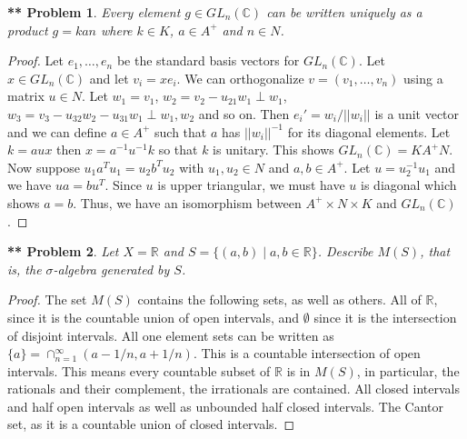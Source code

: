\documentclass{article}
\newtheorem{**}{** Problem}
\begin{document}
\begin{flushleft}
\begin{**}
Every element $g \in GL_n(\mathbb{C})$ can be written uniquely as a product $g = kan$ where $k \in K$, $a \in A^+$ and $n \in N$.
\end{**}
\begin{proof}
Let $e_1, \dots , e_n$ be the standard basis vectors for $GL_n (\mathbb{C})$. Let $x \in GL_n (\mathbb{C})$ and let $v_i = xe_i$. We can orthogonalize $v = (v_1, \dots , v_n)$ using a matrix $u \in N$. Let $w_1 = v_1$, $w_2 = v_2 - u_{21} w_1 \perp w_1$, $w_3 = v_3 - u_{32}w_2 - u_{31}w_1 \perp w_1, w_2$ and so on. Then $e_i' = w_i/||w_i||$ is a unit vector and we can define $a \in A^+$ such that $a$ has $||w_i||^{-1}$ for its diagonal elements. Let $k = aux$ then $x = a^{-1} u^{-1} k$ so that $k$ is unitary. This shows $GL_n (\mathbb{C}) = K A^+ N$. Now suppose $u_1 a^T u_1 = u_2 b^T u_2$ with $u_1, u_2 \in N$ and $a,b \in A^+$. Let $u = u_2^{-1} u_1$ and we have $ua = b u^T$. Since $u$ is upper triangular, we must have $u$ is diagonal which shows $a = b$. Thus, we have an isomorphism between $A^+ \times N \times K$ and $GL_n (\mathbb{C})$.
\end{proof}

\begin{**}
Let $X = \mathbb{R}$ and $S = \{(a,b) \mid a,b \in \mathbb{R}\}$. Describe $M(S)$, that is, the $\sigma$-algebra generated by $S$.
\end{**}
\begin{proof}
The set $M(S)$ contains the following sets, as well as others. All of $\mathbb{R}$, since it is the countable union of open intervals, and $\emptyset$ since it is the intersection of disjoint intervals. All one element sets can be written as $\{a\} = \cap_{n=1}^{\infty} (a-1/n, a+1/n)$. This is a countable intersection of open intervals. This means every countable subset of $\mathbb{R}$ is in $M(S)$, in particular, the rationals and their complement, the irrationals are contained. All closed intervals and half open intervals as well as unbounded half closed intervals. The Cantor set, as it is a countable union of closed intervals.
\end{proof}

\end{flushleft}
\end{document}
